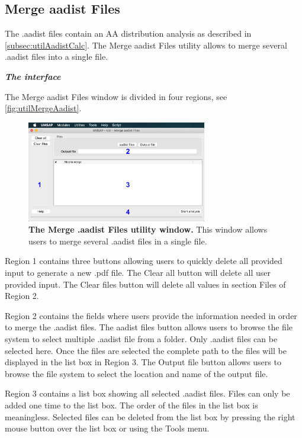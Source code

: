 \subsection{Merge aadist Files}
\label{subsec:utilMergeAadistFiles}

The .aadist files contain an AA distribution analysis as described in \autoref{subsec:utilAadistCalc}. The Merge aadist Files utility allows to merge several .aadist files into a single file.

\textit{\textbf{The interface}}

The Merge aadist Files window is divided in four regions, see \autoref{fig:utilMergeAadist}.

\begin{figure}[h]
	\centering
	\includegraphics[width=0.7\textwidth]{./IMAGES/UTIL-Maadist-WINDOW/util-maadist.jpg}	    
	\caption[The Merge .aadist Files utility window]{\textbf{The Merge .aadist Files utility window.} This window allows users to merge several .aadist files in a single file.}
	\label{fig:utilMergeAadist}
	\vspace{-5pt} 	
\end{figure}

Region \num{1} contains three buttons allowing users to quickly delete all provided input to generate a new .pdf file. The Clear all button will delete all user provided input. The Clear files button will delete all values in section Files of Region \num{2}.

Region \num{2} contains the fields where users provide the information needed in order to merge the .aadist files. The aadist files button allows users to browse the file system to select multiple .aadist file from a folder. Only .aadist files can be selected here. Once the files are selected the complete path to the files will be displayed in the list box in Region \num{3}. The Output file button allows users to browse the file system to select the location and name of the output file.

Region \num{3} contains a list box showing all selected .aadist files. Files can only be added one time to the list box. The order of the files in the list box is meaningless. Selected files can be deleted from the list box by pressing the right mouse button over the list box or using the Tools menu. 

